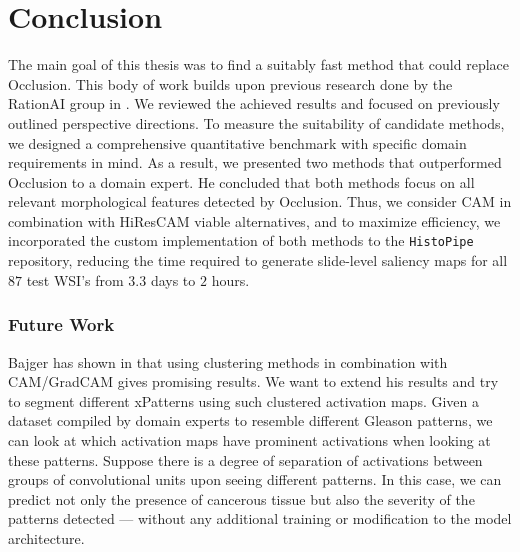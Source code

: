\chapter*{Conclusion}

The main goal of this thesis was to find a suitably fast method that could replace Occlusion.
This body of work builds upon previous research done by the RationAI group in \cite{gallo, bajger-grad-cam, krajnansky-grad-cam, hruska-grad-cam}.
We reviewed the achieved results and focused on previously outlined perspective directions.
To measure the suitability of candidate methods, we designed a comprehensive quantitative benchmark with specific domain requirements in mind.
As a result, we presented two methods that outperformed Occlusion to a domain expert.
He concluded that both methods focus on all relevant morphological features detected by Occlusion.
Thus, we consider CAM in combination with HiResCAM viable alternatives, and to maximize efficiency, we incorporated the custom implementation of both methods to the \texttt{HistoPipe} repository, reducing the time required to generate slide-level saliency maps for all $87$ test WSI's from $3.3$ days to $2$ hours.

\subsection*{Future Work}

Bajger has shown in \cite{bajger-grad-cam} that using clustering methods in combination with CAM/GradCAM gives promising results.
We want to extend his results and try to segment different xPatterns using such clustered activation maps.
Given a dataset compiled by domain experts to resemble different Gleason patterns, we can look at which activation maps have prominent activations when looking at these patterns.
Suppose there is a degree of separation of activations between groups of convolutional units upon seeing different patterns. In this case, we can predict not only the presence of cancerous tissue but also the severity of the patterns detected --- without any additional training or modification to the model architecture. \cite{tmp}